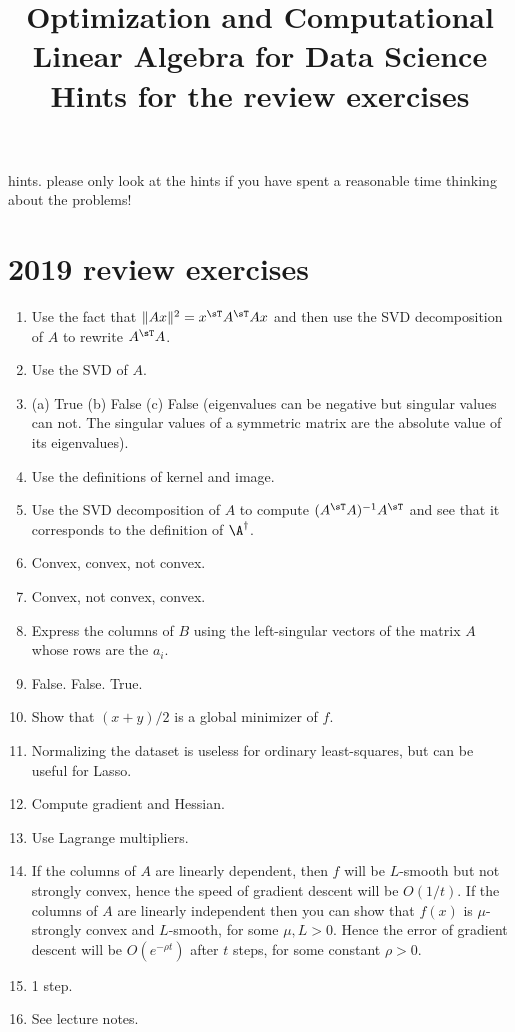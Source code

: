 \documentclass[11pt,nocut]{article}
\title{\vspace{-2.0cm}%
	Optimization and Computational Linear Algebra for Data Science\\
Hints for the review exercises}
\date{}
\begin{document}
\maketitle
%
\begin{center}
	{\large
	hints. please only look at the hints if you have spent a reasonable time thinking about the problems!
	}
\end{center}
\section{2019 review exercises}

\begin{enumerate}
	\item Use the fact that $\|Ax\|^2 = x^{\sT} A^{\sT} A x$ and then use the SVD decomposition of $A$ to rewrite $A^{\sT} A$.
	\item Use the SVD of $A$.
	\item (a) True (b) False (c) False (eigenvalues can be negative but singular values can not. The singular values of a symmetric matrix are the absolute value of its eigenvalues).
	\item Use the definitions of kernel and image.
	\item Use the SVD decomposition of $A$ to compute $(A^{\sT}A)^{-1}A^{\sT}$ and see that it corresponds to the definition of $\A^{\dagger}$.
	\item Convex, convex, not convex.
	\item Convex, not convex, convex.
	\item Express the columns of $B$ using the left-singular vectors of the matrix $A$ whose rows are the $a_i$.
	\item False. False. True.
	\item Show that $(x+y)/2$ is a global minimizer of $f$.
	\item Normalizing the dataset is useless for ordinary least-squares, but can be useful for Lasso.
	\item Compute gradient and Hessian. 
	\item Use Lagrange multipliers.
	\item If the columns of $A$ are linearly dependent, then $f$ will be $L$-smooth but not strongly convex, hence the speed of gradient descent will be $O(1/t)$.
		If the columns of $A$ are linearly independent then you can show that $f(x)$ is $\mu$-strongly convex and $L$-smooth, for some $\mu,L>0$. Hence the error of gradient descent will be $O(e^{-\rho t})$ after $t$ steps, for some constant $\rho>0$. 
	\item 1 step.
	\item See lecture notes.
\end{enumerate}
\end{document}

